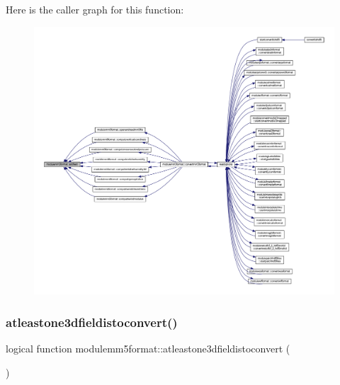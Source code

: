 Here is the caller graph for this function\+:\nopagebreak
\begin{figure}[H]
\begin{center}
\leavevmode
\includegraphics[width=350pt]{namespacemodulemm5format_a136725afeaeb24f9488c92944b7b982a_icgraph}
\end{center}
\end{figure}
\mbox{\label{namespacemodulemm5format_a34e4f7cd15886ee4867c43357fc8f717}} 
\subsubsection{\texorpdfstring{atleastone3dfieldistoconvert()}{atleastone3dfieldistoconvert()}}
{\footnotesize\ttfamily logical function modulemm5format\+::atleastone3dfieldistoconvert (\begin{DoxyParamCaption}{ }\end{DoxyParamCaption})\hspace{0.3cm}{\ttfamily [private]}}

